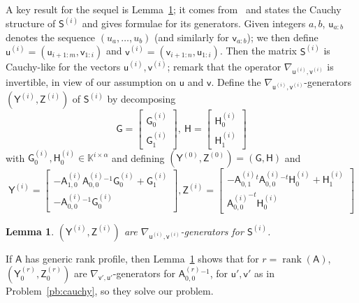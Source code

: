 \documentclass{sig-alternate}
\newcommand{\vu}{\ensuremath{\mathsf{u}}}
\newcommand{\vv}{\ensuremath{\mathsf{v}}}
\newcommand{\mA}{\ensuremath{\mathsf{A}}}
\newcommand{\mG}{\ensuremath{\mathsf{G}}}
\newcommand{\mH}{\ensuremath{\mathsf{H}}}
\newcommand{\mS}{\ensuremath{\mathsf{S}}}
\newcommand{\mY}{\ensuremath{\mathsf{Y}}}
\newcommand{\mZ}{\ensuremath{\mathsf{Z}}}
\newcommand{\K}{\ensuremath{\mathbb{K}}}
\newcommand{\rank}{\ensuremath{\operatorname{rank}}}
\newtheorem{lemma}[definition]{Lemma}
\begin{document}
A key result for the sequel is Lemma~\ref{lemma:cpj-cm}; it comes
from~\cite[Proposition~1]{Cardinal99} and states the Cauchy structure
of $\mS^{(i)}$ and gives formulae for its generators. Given integers
$a,b$, $\vu_{a:b}$ denotes the sequence $(u_a,\dots,u_b)$ (and
similarly for $\vv_{a:b}$); we then define
$\vu^{(i)}=(\vu_{i+1:m},\vv_{1:i})$ and
$\vv^{(i)}=(\vv_{i+1:n},\vu_{1:i})$. Then the matrix $\mS^{(i)}$ is
Cauchy-like for the vectors $\vu^{(i)}, \vv^{(i)}$; remark that the
operator $\nabla_{\vu^{(i)},\vv^{(i)}}$ is invertible, in view of our
assumption on $\vu$ and $\vv$. Define the
$\nabla_{\vu^{(i)},\vv^{(i)}}$-generators $(\mY^{(i)}, \mZ^{(i)})$ of
$\mS^{(i)}$ by decomposing
\[
 \mG=\begin{bmatrix} 
   \mG^{(i)}_0 \\ \mG^{(i)}_1
  \end{bmatrix},\ 
  \mH=\begin{bmatrix} 
        \mH^{(i)}_0 \\    \mH^{(i)}_1 
  \end{bmatrix}
\]
with $\mG^{(i)}_0, \mH^{(i)}_0 \in \K^{i \times \alpha}$ and defining
$(\mY^{(0)},\mZ^{(0)})=(\mG,\mH)$ and 
\[
\!\!\mY^{(i)}\!=\! 
\begin{bmatrix}
-\mA^{(i)}_{1,0}{\mA^{(i)}_{0,0}}{}^{-1}\mG^{(i)}_0 + \mG^{(i)}_1 \\
-{\mA^{(i)}_{0,0}}{}^{-1} \mG^{(i)}_0 
\end{bmatrix}\!,
\mZ^{(i)}\!=\! 
\begin{bmatrix}
-{\mA^{(i)}_{0,1}}{}^t{\mA^{(i)}_{0,0}}{}^{-t}\mH^{(i)}_0 + \mH^{(i)}_1 \\
{\mA^{(i)}_{0,0}}^{-t} \mH^{(i)}_0 
\end{bmatrix}
\]

\begin{lemma}\label{lemma:cpj-cm}
 $(\mY^{(i)},\mZ^{(i)})$ are $\nabla_{\vu^{(i)},\vv^{(i)}}$-generators for $\mS^{(i)}$.
\end{lemma}

If $\mA$ has generic rank profile, then Lemma~\ref{lemma:cpj-cm} shows
that for $r=\rank(\mA)$, $(\mY^{(r)}_0,\mZ^{(r)}_0)$ are
$\nabla_{\vv',\vu'}$-generators for ${\mA^{(r)}_{0,0}}{}^{-1}$, for
$\vu',\vv'$ as in Problem~\ref{pb:cauchy}, so they solve our problem.
\end{document}
